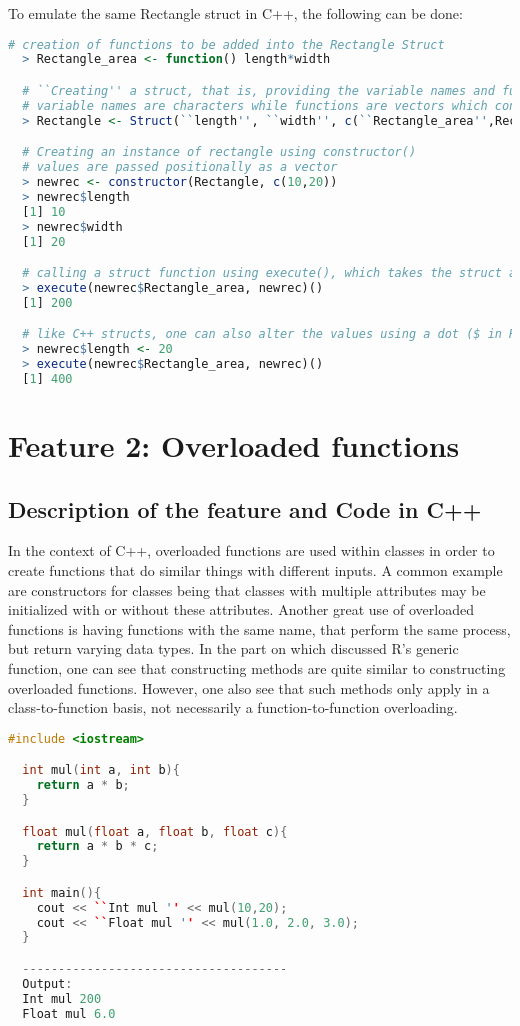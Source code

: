 \documentclass[12pt]{article}
\begin{document}
To emulate the same Rectangle struct in C++, the following can be done:

\begin{lstlisting}[language=R ]
  # creation of functions to be added into the Rectangle Struct
  > Rectangle_area <- function() length*width

  # ``Creating'' a struct, that is, providing the variable names and functions inside the struct
  # variable names are characters while functions are vectors which contain the name and the function
  > Rectangle <- Struct(``length'', ``width'', c(``Rectangle_area'',Rectangle_area))

  # Creating an instance of rectangle using constructor()
  # values are passed positionally as a vector
  > newrec <- constructor(Rectangle, c(10,20))
  > newrec$length
  [1] 10
  > newrec$width
  [1] 20

  # calling a struct function using execute(), which takes the struct and the function as arguments
  > execute(newrec$Rectangle_area, newrec)()
  [1] 200

  # like C++ structs, one can also alter the values using a dot ($ in R)
  > newrec$length <- 20
  > execute(newrec$Rectangle_area, newrec)()
  [1] 400
\end{lstlisting}

\section{Feature 2: Overloaded functions}

\subsection{Description of the feature and Code in C++}
In the context of C++, overloaded functions are used within classes in order to create functions that do similar things with different inputs. A common example are constructors for classes being that classes with multiple attributes may be initialized with or without these attributes. Another great use of overloaded functions is having functions with the same name, that perform the same process, but return varying data types. In the part on which discussed R's generic function, one can see that constructing methods are quite similar to constructing overloaded functions. However, one also see that such methods only apply in a class-to-function basis, not necessarily a function-to-function overloading.

\begin{lstlisting}[language = C++ ]
  #include <iostream>

  int mul(int a, int b){
    return a * b;
  }

  float mul(float a, float b, float c){
    return a * b * c;
  }

  int main(){
    cout << ``Int mul '' << mul(10,20);
    cout << ``Float mul '' << mul(1.0, 2.0, 3.0);
  }

  -------------------------------------
  Output:
  Int mul 200
  Float mul 6.0
\end{lstlisting}
\end{document}
